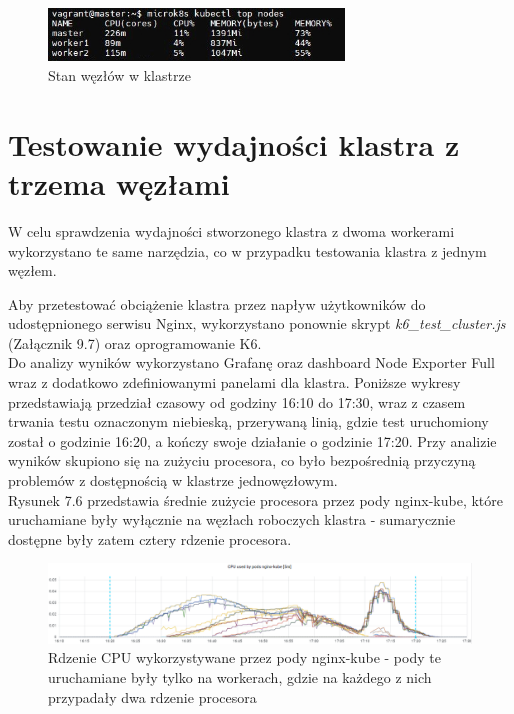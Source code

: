 \begin{figure}[H]
    \centering
    \includegraphics[width=0.7\textwidth]{img2/top-nodes.jpg}
    \caption{Stan węzłów w klastrze}
\end{figure}



\section {Testowanie wydajności klastra z trzema węzłami}

W celu sprawdzenia wydajności stworzonego klastra z dwoma workerami wykorzystano te same narzędzia, co w przypadku testowania klastra z jednym węzłem.

Aby przetestować obciążenie klastra przez napływ użytkowników do udostępnionego serwisu Nginx, wykorzystano ponownie skrypt \textit{k6\_test\_cluster.js} (Załącznik 9.7) oraz oprogramowanie K6. \\

Do analizy wyników wykorzystano Grafanę oraz dashboard Node Exporter Full wraz z dodatkowo zdefiniowanymi panelami dla klastra. Poniższe wykresy przedstawiają przedział czasowy od godziny 16:10 do 17:30, wraz z czasem trwania testu oznaczonym niebieską, przerywaną linią, gdzie test uruchomiony został o godzinie 16:20, a kończy swoje działanie o godzinie 17:20. Przy analizie wyników skupiono się na zużyciu procesora, co było bezpośrednią przyczyną problemów z dostępnością w klastrze jednowęzłowym. \\

Rysunek 7.6 przedstawia średnie zużycie procesora przez pody nginx-kube, które uruchamiane były wyłącznie na węzłach roboczych klastra - sumarycznie dostępne były zatem cztery rdzenie procesora. 

\begin{figure}[H]
    \centering
    \includegraphics[width=1\textwidth]{img2/test1/cpu_nginx.png}
    \caption{Rdzenie CPU wykorzystywane przez pody nginx-kube - pody te uruchamiane były tylko na workerach, gdzie na każdego z nich przypadały dwa rdzenie procesora}
\end{figure}

